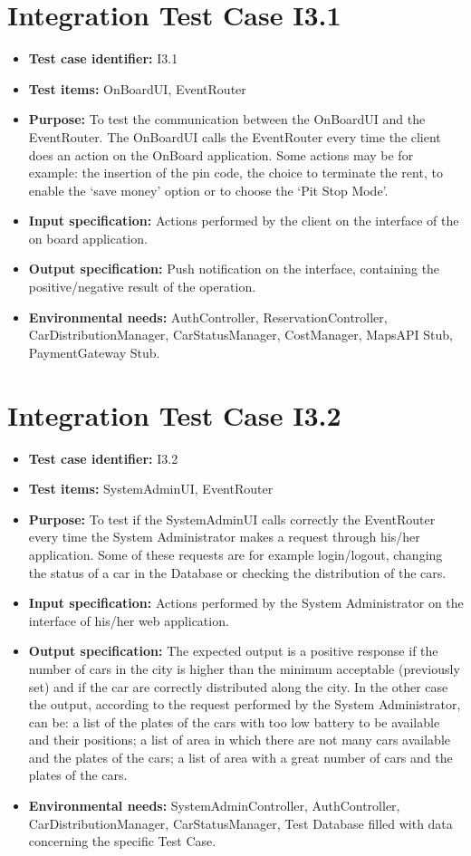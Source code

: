 \section{Integration Test Case I3.1}
\begin{itemize}
\item \textbf{Test case identifier:} I3.1
\item \textbf{Test items:} OnBoardUI, EventRouter
\item \textbf{Purpose:} To test the communication between the OnBoardUI and the EventRouter. The OnBoardUI calls the EventRouter every time the client does an action on the OnBoard application. Some actions may be for example: the insertion of the pin code, the choice to terminate the rent, to enable the ‘save money’ option or to choose the ‘Pit Stop Mode’.
\item \textbf{Input specification:} Actions performed by the client on the interface of the on board application.
\item \textbf{Output specification:} Push notification on the interface, containing the positive/negative result of the operation.
\item \textbf{Environmental needs:} AuthController, ReservationController, CarDistributionManager, CarStatusManager, CostManager, MapsAPI Stub, PaymentGateway Stub.
\end{itemize}

\section{Integration Test Case I3.2}
\begin{itemize}
\item \textbf{Test case identifier:} I3.2
\item \textbf{Test items:} SystemAdminUI, EventRouter
\item \textbf{Purpose:} To test if the SystemAdminUI calls correctly the EventRouter every time the System Administrator makes a request through his/her application. Some of these requests are for example login/logout, changing the status of a car in the Database or checking the distribution of the cars.
\item \textbf{Input specification:} Actions performed by the System Administrator on the interface of his/her web application.
\item \textbf{Output specification:} The expected output is a positive response if the number of cars in the city is higher than the minimum acceptable (previously set) and if the car are correctly distributed along the city. In the other case the output, according to the request performed by the System Administrator, can be: a list of the plates of the cars with too low battery to be available and their positions; a list of area in which there are not many cars available and the plates of the cars; a list of area with a great number of cars and the plates of the cars.
\item \textbf{Environmental needs:} SystemAdminController, AuthController, CarDistributionManager, CarStatusManager, Test Database filled with data concerning the specific Test Case.
\end{itemize}

